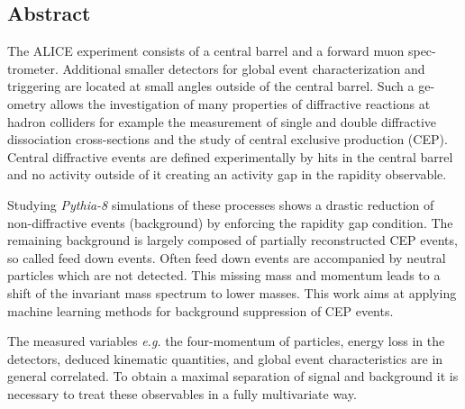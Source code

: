 \documentclass{article}
\begin{document}
\subsection*{Abstract}
The ALICE experiment consists of a central barrel and a forward muon spec-
trometer. Additional smaller detectors for global event characterization and
triggering are located at small angles outside of the central barrel. Such a ge-
ometry allows the investigation of many properties of diffractive reactions at
hadron colliders for example the measurement of single and double diffractive
dissociation cross-sections and the study of central exclusive production (CEP).
Central diffractive events are defined experimentally by hits in the central barrel
and no activity outside of it creating an activity gap in the rapidity observable.

Studying \emph{Pythia-8} simulations of these processes shows a drastic reduction
of non-diffractive events (background) by enforcing the rapidity gap condition.
The remaining background is largely composed of partially reconstructed CEP
events, so called feed down events. Often feed down events are accompanied
by neutral particles which are not detected. This missing mass and momentum
leads to a shift of the invariant mass spectrum to lower masses. This work
aims at applying machine learning methods for background suppression of CEP
events.

The measured variables \emph{e.g.} the four-momentum of particles, energy loss in
the detectors, deduced kinematic quantities, and global event characteristics are
in general correlated. To obtain a maximal separation of signal and background
it is necessary to treat these observables in a fully multivariate way.
\end{document}

